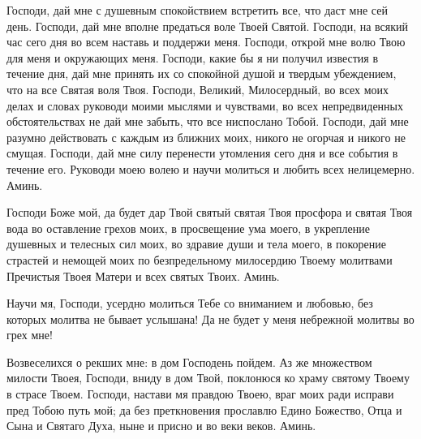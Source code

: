 Господи, дай мне с душевным спокойствием встретить все, что даст мне сей день. Господи, дай мне вполне предаться воле Твоей Святой. Господи, на всякий час сего дня во всем наставь и поддержи меня. Господи, открой мне волю Твою для меня и окружающих меня. Господи, какие бы я ни получил известия в течение дня, дай мне принять их со спокойной душой и твердым убеждением, что на все Святая воля Твоя. Господи, Великий, Милосердный, во всех моих делах и словах руководи моими мыслями и чувствами, во всех непредвиденных обстоятельствах не дай мне забыть, что все ниспослано Тобой. Господи, дай мне разумно действовать с каждым из ближних моих, никого не огорчая и никого не смущая. Господи, дай мне силу перенести утомления сего дня и все события в течение его. Руководи моею волею и научи молиться и любить всех нелицемерно. Аминь.


\mychapterending






Господи Боже мой, да будет дар Твой святый святая Твоя просфора и святая Твоя вода во оставление грехов моих, в просвещение ума моего, в укрепление душевных и телесных сил моих, во здравие души и тела моего, в покорение страстей и немощей моих по безпредельному милосердию Твоему молитвами Пречистыя Твоея Матери и всех святых Твоих. Аминь.


\mychapterending





Научи мя, Господи, усердно молиться Тебе со вниманием и любовью, без которых молитва не бывает услышана! Да не будет у меня небрежной молитвы во грех мне!


\mychapterending





Возвеселихся о рекших мне: в дом Господень пойдем. Аз же множеством милости Твоея, Господи, вниду в дом Твой, поклонюся ко храму святому Твоему в страсе Твоем. Господи, настави мя правдою Твоею, враг моих ради исправи пред Тобою путь мой; да без преткновения прославлю Едино Божество, Отца и Сына и Святаго Духа, ныне и присно и во веки веков. Аминь. 


\mychapterending





